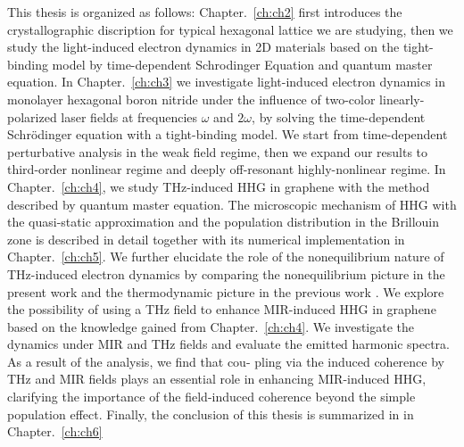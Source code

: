 This thesis is organized as follows: Chapter.~\ref{ch:ch2} first introduces the crystallographic discription
for typical hexagonal lattice we are studying, then we study the light-induced electron dynamics in 2D materials based on the tight-binding model by
time-dependent Schrodinger Equation and quantum master equation. 
In Chapter.~\ref{ch:ch3} we investigate light-induced electron dynamics in monolayer hexagonal
boron nitride under the influence of two-color linearly-polarized laser fields at frequencies
$\omega$ and $2\omega$, by solving the time-dependent Schr\"odinger equation with a tight-binding
model. We start from time-dependent perturbative analysis in the weak field regime, then we expand
our results to third-order nonlinear regime and deeply off-resonant highly-nonlinear regime.
In Chapter.~\ref{ch:ch4}, we study THz-induced HHG in graphene with the method described by quantum
master equation. The microscopic mechanism of
HHG with the quasi-static approximation and the population distribution in the Brillouin zone is
described in detail together with its numerical implementation in Chapter.~\ref{ch:ch5}. We further elucidate the role of the nonequilibrium nature of THz-induced electron dynamics by comparing the nonequilibrium picture in the present work and the thermodynamic picture in the previous work \cite{mics2015thermodynamic}. 
We explore the possibility of using a THz
field to enhance MIR-induced HHG in graphene based
on the knowledge gained from Chapter.~\ref{ch:ch4}. We investigate the dynamics under MIR and THz fields and evaluate the emitted harmonic spectra. As a result of the analysis, we find that cou- pling via the induced coherence by THz and MIR fields plays an essential role in enhancing MIR-induced HHG, clarifying the importance of the field-induced coherence beyond the simple population effect.
Finally, the conclusion of this thesis is summarized in in Chapter.~\ref{ch:ch6}
